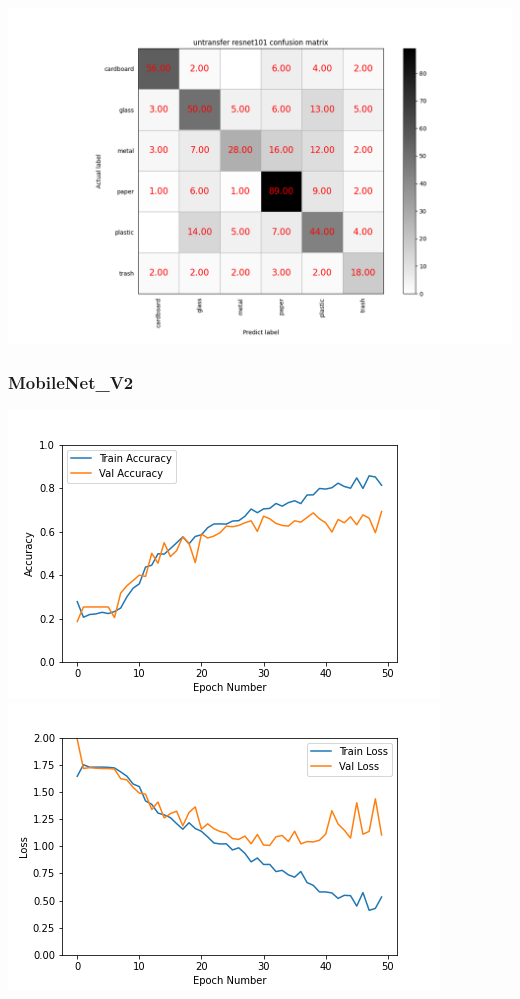 \documentclass[UTF8]{ctexart}
\begin{document}
\includegraphics[scale=0.5]{cm/unres101.png} 

\subsubsection{MobileNet\_V2}

\includegraphics[scale=0.5]{image/mobilenet_v2_36_ADAM_accuracy_curve.png} 
\includegraphics[scale=0.5]{image/mobilenet_v2_36_ADAM_loss_curve.png} 
\end{document}
